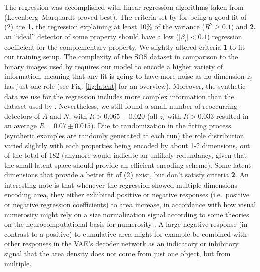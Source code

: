 \documentclass[twocolumn]{article}
\begin{document}
\noindent The regression was accomplished with linear regression algorithms taken
from \citet{newville2016lmfit} (Levenberg--Marquardt proved best). The
criteria set by \citet{stoianov2012} for being a good fit of (2)
are \textbf{1.} the regression explaining at least 10\% of the variance
(\(R^2 \geq 0.1\)) and \textbf{2.}  an ``ideal'' detector of some
property should have a low (\(\mid\beta_i\mid < 0.1\)) regression
coefficient for the complementary property. We slightly altered criteria
\textbf{1} to fit our training setup. The complexity of the SOS
dataset in comparison to the binary images used by \citet{stoianov2012}
requires our model to encode a higher variety of information, meaning
that any fit is going to have more noise as no dimension \(z_i\) has just one
role (see Fig. \ref{fig:latent} for an overview). Moreover, the synthetic data we
use for the regression includes more complex information than the
dataset used by \citet{stoianov2012}. Nevertheless, we still found a
small number of reoccurring detectors of \(A\) and \(N\), with
\(R > 0.065 \pm 0.020\) (all \(z_i\) with \(R > 0.033\) resulted in an
average \(R= 0.07 \pm 0.015\)). Due to randomization in the fitting
process (synthetic examples are randomly generated at each run) the role
distribution varied slightly with each properties being encoded by about
1-2 dimensions, out of the total of 182 (anymore would indicate an
unlikely redundancy, given that the small latent space should provide an
efficient encoding scheme). Some latent dimensions that provide a better
fit of (2) exist, but don't satisfy criteria \textbf{2}. An
interesting note is that whenever the regression showed multiple
dimensions encoding area, they either exhibited positive or negative
responses (i.e.~positive or negative regression coefficients) to area
increase, in accordance with how visual numerosity might rely on a size
normalization signal according to some theories on the
neurocomputational basis for numerosity \citep[for a discussion, see][]{stoianov2012}. A large negative response (in contrast to a
positive) to cumulative area might for example be combined with other
responses in the VAE's decoder network as an indicatory or inhibitory
signal that the area density does not come from just one object, but
from multiple.
\end{document}
